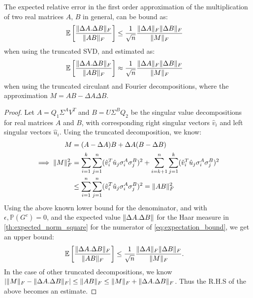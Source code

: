 \documentclass[onefignum,onetabnum]{siamart171218}
\DeclarePairedDelimiter\norm{\lVert}{\rVert}
\begin{document}
\begin{corollary}
    The expected relative error in the first order approximation of the multiplication of two real matrices $A$, $B$ in general, can be bound as:
    \begin{align*}
    \mathbb{E}\left[ \frac{\norm{\Delta A.\Delta B}_F}{\norm{AB}_F}\right]  &\leq \frac{1}{\sqrt{n}} \frac{\norm{\Delta A}_F \norm{\Delta B}_F}{\norm{M}_F }
\end{align*}
when using the truncated SVD, and estimated as:
    \begin{align*}
    \mathbb{E}\left[ \frac{\norm{\Delta A.\Delta B}_F}{\norm{AB}_F}\right]  &\approx \frac{1}{\sqrt{n}} \frac{\norm{\Delta A}_F \norm{\Delta B}_F}{\norm{M}_F }
\end{align*}
when using the truncated circulant and Fourier decompositions, where the approximation $M=AB-\Delta A\Delta B$. \label{th:corollary_error_general}
\end{corollary}
\begin{proof}
    Let $A=Q_1 \Sigma^AV^T$ and $B=U\Sigma^BQ_2$ be the singular value decompositions for real matrices $A$ and $B$, with corresponding right singular vectors $\hat{v}_i$ and left singular vectors $\hat{u}_i$. Using the truncated decomposition, we know:
    \begin{align*}
    M &= (A-\Delta A)B + \Delta A (B-\Delta B)\\
    \implies\norm{M}_F^2 &= \sum_{i=1}^k \sum_{j=1}^n (\hat{v}_i^T\hat{u}_j\sigma_i^A \sigma_j^B)^2 + \sum_{i=k+1}^n \sum_{j=1}^k (\hat{v}_i^T\hat{u}_j\sigma_i^A \sigma_j^B)^2\\ &\leq \sum_{i=1}^n \sum_{j=1}^n (\hat{v}_i^T\hat{u}_j\sigma_i^A \sigma_j^B)^2 = \norm{AB}_F^2
    \end{align*}
Using the above known lower bound for the denominator, and with $\epsilon,\mathbb{P}(G^c)=0$, and the expected value $\norm{\Delta A. \Delta B}$ for the Haar measure in \ref{th:expected_norm_square} for the numerator of \eqref{eq:expectation_bound}, we get an upper bound:
    \begin{align*}
    \mathbb{E}\left[ \frac{\norm{\Delta A.\Delta B}_F}{\norm{AB}_F}\right]  &\leq \frac{1}{\sqrt{n}} \frac{\norm{\Delta A}_F \norm{\Delta B}_F}{\norm{M}_F}.
\end{align*}
In the case of other truncated decompositions, we know $|\norm{M}_F-\norm{\Delta A. \Delta B}_F| \leq \norm{AB}_F \leq \norm{M}_F + \norm{\Delta A. \Delta B}_F$. Thus the R.H.S of the above becomes an estimate. 
\end{proof}
\end{document}
